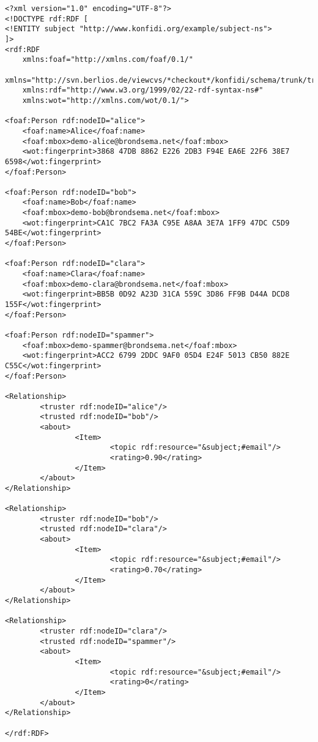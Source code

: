 \begin{verbatim}
<?xml version="1.0" encoding="UTF-8"?>
<!DOCTYPE rdf:RDF [
<!ENTITY subject "http://www.konfidi.org/example/subject-ns">
]>
<rdf:RDF
    xmlns:foaf="http://xmlns.com/foaf/0.1/"
    xmlns="http://svn.berlios.de/viewcvs/*checkout*/konfidi/schema/trunk/trust.owl#"
    xmlns:rdf="http://www.w3.org/1999/02/22-rdf-syntax-ns#"
    xmlns:wot="http://xmlns.com/wot/0.1/">

<foaf:Person rdf:nodeID="alice"> 
    <foaf:name>Alice</foaf:name>
    <foaf:mbox>demo-alice@brondsema.net</foaf:mbox>
    <wot:fingerprint>3868 47DB 8862 E226 2DB3 F94E EA6E 22F6 38E7 6598</wot:fingerprint>
</foaf:Person>

<foaf:Person rdf:nodeID="bob"> 
    <foaf:name>Bob</foaf:name>
    <foaf:mbox>demo-bob@brondsema.net</foaf:mbox>
    <wot:fingerprint>CA1C 7BC2 FA3A C95E A8AA 3E7A 1FF9 47DC C5D9 54BE</wot:fingerprint>
</foaf:Person>

<foaf:Person rdf:nodeID="clara"> 
    <foaf:name>Clara</foaf:name>
    <foaf:mbox>demo-clara@brondsema.net</foaf:mbox>
    <wot:fingerprint>BB5B 0D92 A23D 31CA 559C 3D86 FF9B D44A DCD8 155F</wot:fingerprint>
</foaf:Person>

<foaf:Person rdf:nodeID="spammer">
    <foaf:mbox>demo-spammer@brondsema.net</foaf:mbox>
    <wot:fingerprint>ACC2 6799 2DDC 9AF0 05D4 E24F 5013 CB50 882E C55C</wot:fingerprint>
</foaf:Person>

<Relationship>
        <truster rdf:nodeID="alice"/>
        <trusted rdf:nodeID="bob"/>
        <about>
                <Item>
                        <topic rdf:resource="&subject;#email"/>
                        <rating>0.90</rating>
                </Item>
        </about>
</Relationship>

<Relationship>
        <truster rdf:nodeID="bob"/>
        <trusted rdf:nodeID="clara"/>
        <about>
                <Item>
                        <topic rdf:resource="&subject;#email"/>
                        <rating>0.70</rating>
                </Item>
        </about>
</Relationship>

<Relationship>
        <truster rdf:nodeID="clara"/>
        <trusted rdf:nodeID="spammer"/>
        <about>
                <Item>
                        <topic rdf:resource="&subject;#email"/>
                        <rating>0</rating>
                </Item>
        </about>
</Relationship>

</rdf:RDF>
\end{verbatim}
